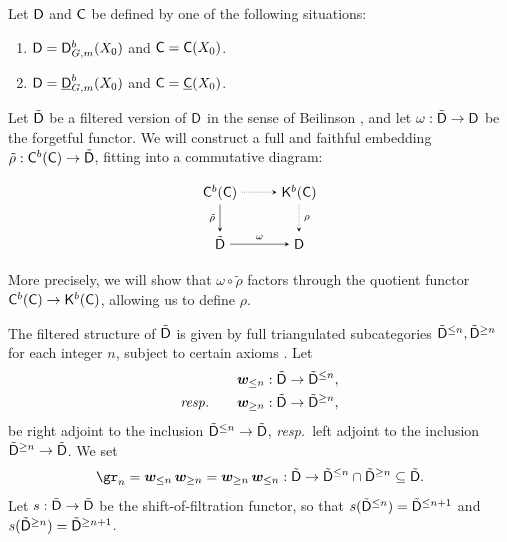 \documentclass[a4paper,10pt,leqno]{amsart}
\theoremstyle{plain}
\theoremstyle{plain}
\theoremstyle{plain}
\theoremstyle{definition}
\theoremstyle{remark}
\begin{document}
Let $\sf{D}$ and $\sf{C}$ be defined by one of the following situations:
\begin{enumerate}
\item 	$\sf{D} = \sf{D}_{G, m}^b(X_0)$ and $\sf{C} = \sf{C}(X_0)$.
\item 	$\sf{D} = \underline{\sf{D}}_{G, m}^b(X_0)$ and $\sf{C} = \underline{\sf{C}}(X_0)$.
\end{enumerate}
Let $\tilde{\sf{D}}$ be a filtered version of $\sf{D}$ in the sense of Beilinson \cite{beilinson}, and let $\omega : \tilde{\sf{D}} \to \sf{D}$ be the forgetful functor.
We will construct a full and faithful embedding $\tilde{\rho} : \sf{C}^b(\sf{C}) \to \tilde{\sf{D}}$, fitting into a commutative diagram:
\begin{equation}
\begin{tikzpicture}[baseline=(current bounding box.center), >=stealth]
\matrix(m)[matrix of math nodes, row sep=2em, column sep=2.5em, text height=2ex, text depth=0.5ex]
{	\sf{C}^b(\sf{C})
		&\sf{K}^b(\sf{C})\\
	\tilde{\sf{D}}
		&\sf{D}\\
		};
\path[->,font=\scriptsize, auto]
(m-1-1)		edge node[left]{$\tilde{\rho}$} (m-2-1)
(m-2-1)		edge node{$\omega$} (m-2-2);
\path[->,font=\scriptsize, auto, densely dotted]
(m-1-1)		edge (m-1-2)
(m-1-2)		edge node{$\rho$} (m-2-2);
\end{tikzpicture}
\end{equation}
More precisely, we will show that $\omega \circ \tilde{\rho}$ factors through the quotient functor $\sf{C}^b(\sf{C}) \to \sf{K}^b(\sf{C})$, allowing us to define $\rho$.

The filtered structure of $\tilde{\sf{D}}$ is given by full triangulated subcategories $\tilde{\sf{D}}^{\leq n}, \tilde{\sf{D}}^{\geq n}$ for each integer $n$, subject to certain axioms \cite[Def.\ 3.1]{rider}.
Let 
\begin{align}
\bm{w}_{\leq n} : \tilde{\sf{D}} &\to \tilde{\sf{D}}^{\leq n},\\
\emph{resp.}\qquad
\bm{w}_{\geq n} : \tilde{\sf{D}} &\to \tilde{\sf{D}}^{\geq n},
\end{align}
be right adjoint to the inclusion $\tilde{\sf{D}}^{\leq n} \to \tilde{\sf{D}}$, \emph{resp.}\ left adjoint to the inclusion $\tilde{\sf{D}}^{\geq n} \to \tilde{\sf{D}}$.
We set
\begin{align}
\gr_n = \bm{w}_{\leq n}\,\bm{w}_{\geq n} = \bm{w}_{\geq n}\,\bm{w}_{\leq n} : \tilde{\sf{D}} \to \tilde{\sf{D}}^{\leq n} \cap \tilde{\sf{D}}^{\geq n} \subseteq \tilde{\sf{D}}.
\end{align}
Let $s : \tilde{\sf{D}} \to \tilde{\sf{D}}$ be the shift-of-filtration functor, so that $s(\tilde{\sf{D}}^{\leq n}) = \tilde{\sf{D}}^{\leq n + 1}$ and $s(\tilde{\sf{D}}^{\geq n}) = \tilde{\sf{D}}^{\geq n + 1}$.
\end{document}

